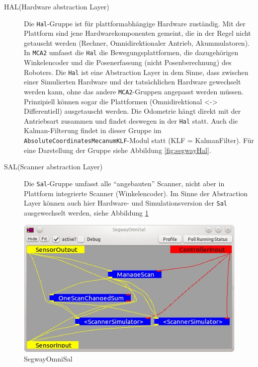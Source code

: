 \begin{description}
\item[HAL(Hardware abstraction Layer)] Die \lstinline{Hal}-Gruppe ist für
 plattformabhängige Hardware zu\-ständig.
 Mit der Plattform sind jene Hardwarekomponenten gemeint, die in der Regel nicht getauscht werden 
 (Rechner, Omnidirektionaler Antrieb, Akummulatoren).
 In \lstinline{MCA2} umfasst die \lstinline{Hal} die Bewegungsplattformen, die dazugehörigen
 Winkelencoder und die Posenerfassung (nicht Posenberechnung) des Roboters. Die \lstinline{Hal} ist eine Abstraction Layer in dem Sinne, dass zwischen einer Simulierten
 Hardware und der tatsächlichen Hardware gewechselt werden kann, ohne das andere
 \lstinline{MCA2}-Gruppen angepasst werden müssen.
 Prinzipiell können sogar die Plattformen (Omnidirektional <-> Differentiell) ausgetauscht werden. Die Odometrie hängt
 direkt mit der Antriebsart zusammen und findet deswegen in der \lstinline{Hal} statt.
 Auch die Kalman-Filterung findet in dieser Gruppe im
 \lstinline{AbsoluteCoordinatesMecanumKLF}-Modul statt (KLF = KalmanFilter). Für
 eine Darstellung der Gruppe siehe Abbildung \ref{fig:segwayHal}.
\item[SAL(Scanner abstraction Layer)] Die \lstinline{Sal}-Gruppe umfasst alle ``angebauten''
Scanner, nicht aber in Plattform integrierte Scanner (Winkelencoder).
 Im Sinne der Abstraction Layer können auch hier Hardware- und
 Simulationsversion der \lstinline{Sal} ausgewechselt werden, siehe Abbildung
 \ref{fig:SegwayOmniSal}
\end{description}
\begin{figure}[h]
\center
\includegraphics[scale=0.7]{graphics/SegwayOmniSal.jpg}
\caption{\label{fig:SegwayOmniSal} SegwayOmniSal}
\end{figure}

